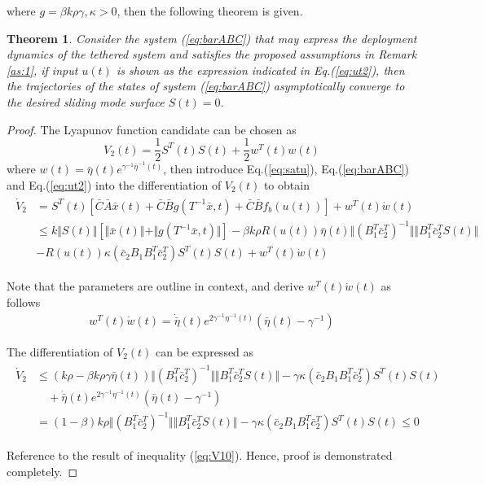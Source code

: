\documentclass[3p]{elsarticle}
\theoremstyle{plain}
\newtheorem{thm}{Theorem}
\begin{document}
where $g = \beta k\rho\gamma,\kappa>0$, then the following theorem is given.
\begin{thm}
Consider the system (\ref{eq:barABC}) that may express the deployment dynamics of the tethered system and satisfies the proposed assumptions in Remark \ref{as:1}, if input $u(t)$ is shown as the expression indicated in Eq.(\ref{eq:ut2}), then the trajectories of the states of system (\ref{eq:barABC}) asymptotically converge to the desired sliding mode surface $S(t)=0$.
\end{thm}
\begin{proof}
The Lyapunov function candidate can be chosen as
\begin{equation}
V_2(t) = \frac{1}{2}S^T(t)S(t)+\frac{1}{2}w^T(t)w(t)
\end{equation}
where $w(t) = \bar{\eta}(t)e^{\gamma^{-1}\bar{\eta}^{-1}(t)}$, then introduce Eq.(\ref{eq:satu}), Eq.(\ref{eq:barABC}) and Eq.(\ref{eq:ut2}) into the differentiation of $V_2(t)$ to obtain
\begin{align}
\begin{split}
\dot{V}_2 &= S^T(t)[\bar{C}\bar{A}\bar{x}(t)+\bar{C}\bar{B}g(T^{-1}\bar{x},t)+\bar{C}\bar{B}f_b(u(t))]+w^T(t)\dot{w}(t)\\
&\le k\Vert S(t)\Vert[\Vert \bar{x}(t)\Vert+\Vert g(T^{-1}\bar{x},t)\Vert] - \beta k \rho R(u(t))\bar{\eta}(t)\Vert(B_1^T\bar{c}^T_2)^{-1}\Vert \Vert B^T_1\bar{c}_2^TS(t)\Vert\\
& -R(u(t))\kappa (\bar{c}_2B_1B_1^T\bar{c}^T_2)S^T(t)S(t)+w^T(t)\dot{w}(t)\label{eq:dotV2}
\end{split}
\end{align}\par
Note that the parameters are outline in context, and derive $w^T(t)\dot{w}(t)$ as follows
\begin{align}
w^T(t)\dot w(t) = \dot{\bar\eta}(t)e^{2\gamma^{-1}\eta^{-1}(t)}(\bar\eta(t)-\gamma^{-1})
\end{align}\par
The differentiation of $V_2(t)$ can be expressed as
\begin{align}
\begin{split}
\dot{V}_2 &\le (k\rho - \beta k \rho \gamma \bar{\eta}(t))\Vert(B_1^T\bar{c}^T_2)^{-1}\Vert \Vert B^T_1\bar{c}_2^TS(t)\Vert -\gamma\kappa (\bar{c}_2B_1B_1^T\bar{c}^T_2)S^T(t)S(t)\\
 &\quad + \dot{\bar\eta}(t)e^{2\gamma^{-1}\eta^{-1}(t)}(\bar\eta(t)-\gamma^{-1})\\
 &= (1 -\beta)k\rho\Vert(B_1^T\bar{c}^T_2)^{-1}\Vert \Vert B^T_1\bar{c}_2^TS(t) \Vert-\gamma\kappa (\bar{c}_2B_1B_1^T\bar{c}^T_2)S^T(t)S(t)\le 0
\end{split}
\end{align}\par
Reference to the result of inequality (\ref{eq:V10}). Hence, proof is demonstrated completely.
\end{proof}
\end{document}
